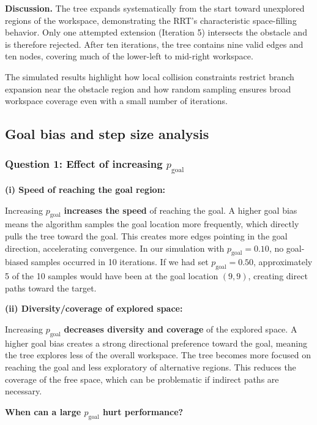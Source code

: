\documentclass[11pt]{article}
\begin{document}
\textbf{Discussion.}
The tree expands systematically from the start toward unexplored regions of the workspace, demonstrating the RRT’s characteristic space-filling behavior.  
Only one attempted extension (Iteration 5) intersects the obstacle and is therefore rejected. After ten iterations, the tree contains nine valid edges and ten nodes, covering much of the lower-left to mid-right workspace.

The simulated results highlight how local collision constraints restrict branch expansion near the obstacle region and how random sampling ensures broad workspace coverage even with a small number of iterations.


\subsection{Goal bias and step size analysis}

\subsubsection{Question 1: Effect of increasing $p_{\text{goal}}$}

\textbf{(i) Speed of reaching the goal region:}

Increasing $p_{\text{goal}}$ \textbf{increases the speed} of reaching the goal. A higher goal bias means the algorithm samples the goal location more frequently, which directly pulls the tree toward the goal. This creates more edges pointing in the goal direction, accelerating convergence. In our simulation with $p_{\text{goal}} = 0.10$, no goal-biased samples occurred in 10 iterations. If we had set $p_{\text{goal}} = 0.50$, approximately 5 of the 10 samples would have been at the goal location $(9,9)$, creating direct paths toward the target.

\textbf{(ii) Diversity/coverage of explored space:}

Increasing $p_{\text{goal}}$ \textbf{decreases diversity and coverage} of the explored space. A higher goal bias creates a strong directional preference toward the goal, meaning the tree explores less of the overall workspace. The tree becomes more focused on reaching the goal and less exploratory of alternative regions. This reduces the coverage of the free space, which can be problematic if indirect paths are necessary.

\textbf{When can a large $p_{\text{goal}}$ hurt performance?}
\end{document}

